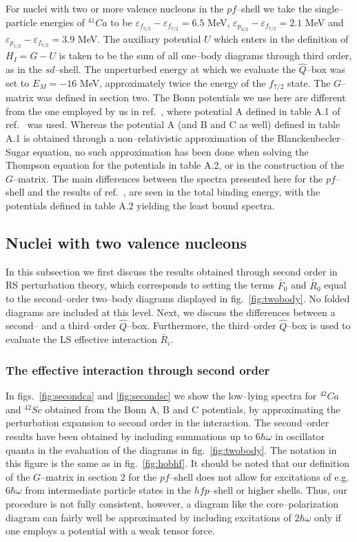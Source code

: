 For nuclei with two or more valence nucleons in the $pf$--shell we take the
single--particle energies of $^{41}Ca$ to be
$\varepsilon_{f_{5/2}}-\varepsilon_{f_{7/2}}=6.5$ MeV,
$\varepsilon_{p_{3/2}}-\varepsilon_{f_{7/2}}=2.1$ MeV and
$\varepsilon_{p_{1/2}}-\varepsilon_{f_{7/2}}=3.9$ MeV. The auxiliary potential $U$ which
enters in the definition of $H_I = G-U$ is taken to be the sum of all one--body diagrams
through third order, as in the $sd$--shell. The unperturbed energy at which
we evaluate the $\hat{Q}$--box was set to $E_M = -16$ MeV, approximately twice the energy
of the $f_{7/2}$ state. The $G$--matrix was defined in section two. The Bonn 
potentials 
we use here are  different from the one employed by us in ref.\ \cite{heho92}, where
potential A defined in table A.1 of ref.\ \cite{mac89} was used.
Whereas the potential A (and B and C as well)
defined in table A.1 
is obtained through a non--relativistic approximation of the Blanckenbecler--Sugar
equation,  no such approximation has been done when solving the Thompson equation
for the potentials in table A.2, or in the construction of the $G$--matrix. 
The main differences between the 
spectra presented here for the $pf$--shell 
and the results of
ref.\ \cite{heho92}, are seen in the total binding energy, with the potentials
defined in table A.2 yielding the least bound spectra.

\subsection{Nuclei with two valence nucleons}
In this subsection we first discuss the results obtained through second order in RS
perturbation theory, which corresponds to setting 
the terms $\tilde{F_0}$ and $\tilde{R_0}$
equal to the second--order two--body diagrams displayed in fig.\ \ref{fig:twobody}.
No folded diagrams are included at this level. Next, we discuss the differences
between a second-- and a third--order $\hat{Q}$--box. Furthermore, the third--order
$\hat{Q}$--box is used to evaluate the LS effective interaction $\tilde{R_i}$.

\subsubsection{The effective interaction through second order}
In figs.\ \ref{fig:secondca} and \ref{fig:secondsc} we show the low--lying
spectra for $^{42}Ca$ and $^{42}Sc$ obtained from the Bonn A, B and C
potentials, by approximating the perturbation expansion
to second order in the interaction. The second--order results have been
obtained by including summations up to $6\hbar\omega$ in oscillator quanta
in the evaluation of the diagrams in fig.\ \ref{fig:twobody}. 
The notation
in this figure is the same as in fig.\ \ref{fig:hobhf}.
It should be noted that
our definition of the $G$--matrix in section 2 for the $pf$--shell does not allow for
excitations of e.g. $6\hbar\omega$ from intermediate particle states in 
the $hfp$--shell or higher shells. Thus, our procedure is not fully consistent,
however, a diagram like the core--polarization diagram can fairly well be approximated
by including excitations of $2\hbar\omega$ only if one employs a potential
with a weak tensor force. 

